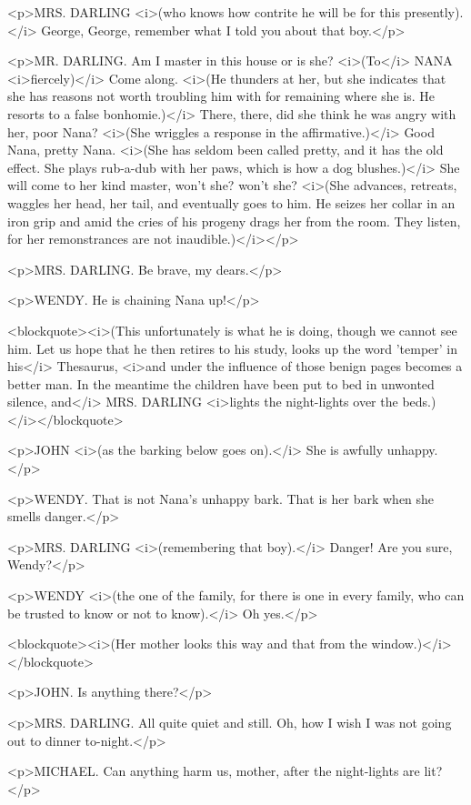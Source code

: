 <p>MRS. DARLING <i>(who knows how contrite he will be for this presently).</i> George, George, remember what I told you about that boy.</p>

<p>MR. DARLING. Am I master in this house or is she? <i>(To</i> NANA <i>fiercely)</i> Come along. <i>(He thunders at her, but she indicates that she has reasons not worth troubling him with for remaining where she is. He resorts to a false bonhomie.)</i> There, there, did she think he was angry with her, poor Nana? <i>(She wriggles a response in the affirmative.)</i> Good Nana, pretty Nana. <i>(She has seldom been called pretty, and it has the old effect. She plays rub-a-dub with her paws, which is how a dog blushes.)</i> She will come to her kind master, won't she? won't she? <i>(She advances, retreats, waggles her head, her tail, and eventually goes to him. He seizes her collar in an iron grip and amid the cries of his progeny drags her from the room. They listen, for her remonstrances are not inaudible.)</i></p>

<p>MRS. DARLING. Be brave, my dears.</p>

<p>WENDY. He is chaining Nana up!</p>

<blockquote><i>(This unfortunately is what he is doing, though we cannot see him. Let us hope that he then retires to his study, looks up the word 'temper' in his</i> Thesaurus, <i>and under the influence of those benign pages becomes a better man. In the meantime the children have been put to bed in unwonted silence, and</i> MRS. DARLING <i>lights the night-lights over the beds.)</i></blockquote>

<p>JOHN <i>(as the barking below goes on).</i> She is awfully unhappy.</p>

<p>WENDY. That is not Nana's unhappy bark. That is her bark when she smells danger.</p>

<p>MRS. DARLING <i>(remembering that boy).</i> Danger! Are you sure, Wendy?</p>

<p>WENDY <i>(the one of the family, for there is one in every family, who can be trusted to know or not to know).</i> Oh yes.</p>

<blockquote><i>(Her mother looks this way and that from the window.)</i></blockquote>

<p>JOHN. Is anything there?</p>

<p>MRS. DARLING. All quite quiet and still. Oh, how I wish I was not going out to dinner to-night.</p>

<p>MICHAEL. Can anything harm us, mother, after the night-lights are lit?</p>

